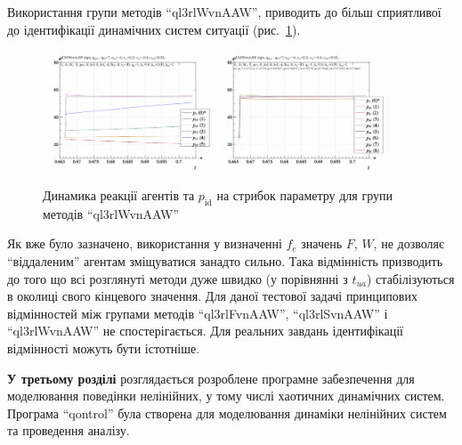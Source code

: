 \documentclass[a4paper,13pt]{atuaref}
\begin{document}
Використання  групи методів ``ql3rlWvnAAW'',
приводить до більш сприятливої до ідентифікації динамічних систем ситуації
(рис.~\ref{atu:f:ql3rlWvnAAW_sign}).

\begin{figure}[htb!]
  \centerline{
    \includegraphics[width=0.45\textwidth]{p3/p/sign/qls-p_t_pi_m_ql3rlWvnAAW_sign.png}
    \hfill
    \includegraphics[width=0.45\textwidth]{p3/p/sign/qls-p_t_p_m_ql3rlWvnAAW_sign.png}
  }
  \caption{Динамика реакції агентів та $p_\mathrm{id}$ на стрибок параметру для групи методів ``ql3rlWvnAAW''}
  \label{atu:f:ql3rlWvnAAW_sign}
\end{figure}

Як вже було зазначено, використання у визначенні $ f_e $ значень $F$, $W$,
не дозволяє ``віддаленим'' агентам зміщуватися занадто сильно. Така відмінність
призводить до того що всі розглянуті методи дуже швидко (у порівнянні з $ t_{ua} $)
стабілізуються в околиці свого кінцевого значення.
%
Для даної тестової задачі принципових відмінностей між групами методів
``ql3rlFvnAAW'', ``ql3rlSvnAAW'' і ``ql3rlWvnAAW'' не спостерігається. Для
реальних завдань ідентифікації відмінності можуть бути істотніше.



\medskip
\textbf{У третьому розділі}
розглядається розроблене програмне
забезпечення
для моделювання
поведінки  нелінійних,
у тому числі хаотичних динамічних систем.
Програма ``qontrol'' була створена для моделювання динаміки
нелінійних систем та проведення аналізу.
\end{document}
